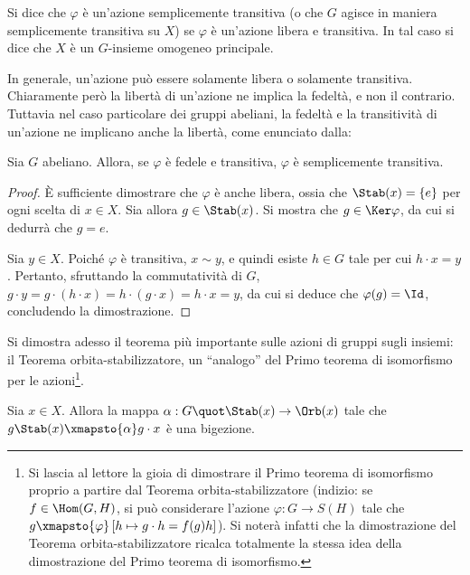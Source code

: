 \documentclass[12pt]{scrartcl}
\begin{document}
	\begin{definition}
		Si dice che $\varphi$ è un'azione semplicemente transitiva (o che $G$ agisce in
		maniera semplicemente transitiva su $X$) se $\varphi$ è un'azione libera e
		transitiva. In tal caso si dice che $X$ è un $G$-insieme omogeneo principale.
	\end{definition} \medskip
	
	In generale, un'azione può essere solamente libera o solamente transitiva. Chiaramente
	però la libertà di un'azione ne implica la fedeltà, e non il contrario. Tuttavia
	nel caso particolare dei gruppi abeliani, la fedeltà e la transitività di un'azione
	ne implicano anche la libertà, come enunciato dalla:
	
	\begin{proposition}
		Sia $G$ abeliano. Allora, se $\varphi$ è fedele e transitiva, $\varphi$ è
		semplicemente transitiva.
	\end{proposition}
	
	\begin{proof}
		È sufficiente dimostrare che $\varphi$ è anche libera, ossia che $\Stab(x) = \{e\}$
		per ogni scelta di $x \in X$. Sia allora $g \in \Stab(x)$. Si mostra che
		$g \in \Ker \varphi$, da cui si dedurrà che $g = e$. \medskip
		
		
		Sia $y \in X$. Poiché $\varphi$ è transitiva, $x \sim y$, e quindi esiste
		$h \in G$ tale per cui $h \cdot x = y$. Pertanto, sfruttando la commutatività
		di $G$, $g \cdot y = g \cdot (h \cdot x) =
		h \cdot (g \cdot x) = h \cdot x = y$, da cui si deduce che $\varphi(g) = \Id$,
		concludendo la dimostrazione.
	\end{proof} \bigskip
	
	Si dimostra adesso il teorema più importante sulle azioni di gruppi sugli insiemi: il
	Teorema orbita-stabilizzatore, un ``analogo'' del Primo teorema di isomorfismo per
	le azioni\footnote{Si lascia al lettore la gioia di dimostrare il Primo teorema di isomorfismo proprio a partire dal Teorema orbita-stabilizzatore (indizio: se $f \in \Hom(G,H)$, si può considerare l'azione $\varphi : G \to S(H)$ tale che $g \xmapsto{\varphi} \left[ h \mapsto g \cdot h = f(g)h \right]$). Si noterà infatti
	che la dimostrazione del Teorema orbita-stabilizzatore ricalca totalmente la
	stessa idea della dimostrazione del Primo teorema di isomorfismo.}.
	
	\begin{theorem}
		Sia $x \in X$. Allora la mappa $\alpha : G \quot \Stab(x) \to \Orb(x)$ tale
		che $g \Stab(x) \xmapsto{\alpha} g \cdot x$ è una bigezione.
	\end{theorem}
	
\end{document}
